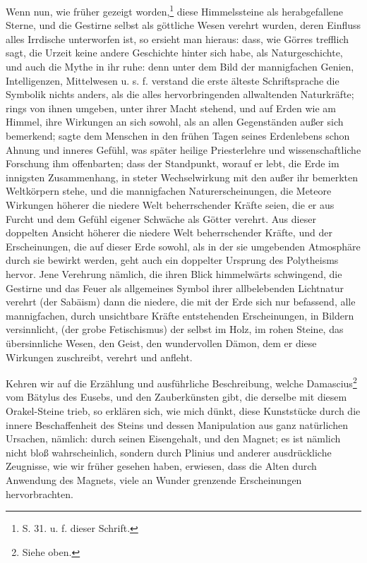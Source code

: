 \documentclass[a4paper, 11pt, oneside, polutonikogreek, german]{article}
\begin{document}
Wenn nun, wie früher gezeigt worden,\footnote{S. 31. u. f. dieser Schrift.} diese Himmelssteine als herabgefallene Sterne, und die Gestirne selbst als göttliche Wesen verehrt wurden, deren Einfluss alles Irrdische unterworfen ist, so ersieht man hieraus: dass, wie Görres trefflich sagt, die Urzeit keine andere Geschichte hinter sich habe, als Naturgeschichte, und auch die Mythe in ihr ruhe: denn unter dem Bild der mannigfachen Genien, Intelligenzen, Mittelwesen u. s. f. verstand die erste älteste Schriftsprache die Symbolik nichts anders, als die alles hervorbringenden allwaltenden Naturkräfte; rings von ihnen umgeben, unter ihrer Macht stehend, und auf Erden wie am Himmel, ihre Wirkungen an sich sowohl, als an allen Gegenständen außer sich bemerkend; sagte dem Menschen in den frühen Tagen seines Erdenlebens schon Ahnung und inneres Gefühl, was später heilige Priesterlehre und wissenschaftliche Forschung ihm offenbarten; dass der Standpunkt, worauf er lebt, die Erde im innigsten Zusammenhang, in steter Wechselwirkung mit den außer ihr bemerkten Weltkörpern stehe, und die mannigfachen Naturerscheinungen, die Meteore Wirkungen höherer die niedere Welt beherrschender Kräfte seien, die er aus Furcht und dem Gefühl eigener Schwäche als Götter verehrt. Aus dieser doppelten Ansicht höherer die niedere Welt beherrschender Kräfte, und der Erscheinungen, die auf dieser Erde sowohl, als in der sie umgebenden Atmosphäre durch sie bewirkt werden, geht auch ein doppelter Ursprung des Polytheisms hervor. Jene Verehrung nämlich, die ihren Blick himmelwärts schwingend, die Gestirne und das Feuer als allgemeines Symbol ihrer allbelebenden Lichtnatur verehrt (der Sabäism) dann die niedere, die mit der Erde sich nur befassend, alle mannigfachen, durch unsichtbare Kräfte entstehenden Erscheinungen, in Bildern versinnlicht, (der grobe Fetischismus) der selbst im Holz, im rohen Steine, das übersinnliche Wesen, den Geist, den wundervollen Dämon, dem er diese Wirkungen zuschreibt, verehrt und anfleht.

Kehren wir auf die Erzählung und ausführliche Beschreibung, welche Damascius\footnote{Siehe oben.} vom Bätylus des Eusebs, und den Zauberkünsten gibt, die derselbe mit diesem Orakel-Steine trieb, so erklären sich, wie mich dünkt, diese Kunststücke durch die innere Beschaffenheit des Steins und dessen Manipulation aus ganz natürlichen Ursachen, nämlich: durch seinen Eisengehalt, und den Magnet; es ist nämlich nicht bloß wahrscheinlich, sondern durch Plinius und anderer ausdrückliche Zeugnisse, wie wir früher gesehen haben, erwiesen, dass die Alten durch Anwendung des Magnets, viele an Wunder grenzende Erscheinungen hervorbrachten.
\end{document}
